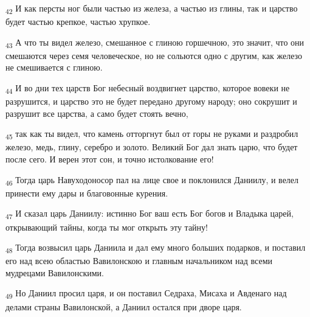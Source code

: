 \begin{tcolorbox}
\textsubscript{42} И как персты ног были частью из железа, а частью из глины, так и царство будет частью крепкое, частью хрупкое.
\end{tcolorbox}
\begin{tcolorbox}
\textsubscript{43} А что ты видел железо, смешанное с глиною горшечною, это значит, что они смешаются через семя человеческое, но не сольются одно с другим, как железо не смешивается с глиною.
\end{tcolorbox}
\begin{tcolorbox}
\textsubscript{44} И во дни тех царств Бог небесный воздвигнет царство, которое вовеки не разрушится, и царство это не будет передано другому народу; оно сокрушит и разрушит все царства, а само будет стоять вечно,
\end{tcolorbox}
\begin{tcolorbox}
\textsubscript{45} так как ты видел, что камень отторгнут был от горы не руками и раздробил железо, медь, глину, серебро и золото. Великий Бог дал знать царю, что будет после сего. И верен этот сон, и точно истолкование его!
\end{tcolorbox}
\begin{tcolorbox}
\textsubscript{46} Тогда царь Навуходоносор пал на лице свое и поклонился Даниилу, и велел принести ему дары и благовонные курения.
\end{tcolorbox}
\begin{tcolorbox}
\textsubscript{47} И сказал царь Даниилу: истинно Бог ваш есть Бог богов и Владыка царей, открывающий тайны, когда ты мог открыть эту тайну!
\end{tcolorbox}
\begin{tcolorbox}
\textsubscript{48} Тогда возвысил царь Даниила и дал ему много больших подарков, и поставил его над всею областью Вавилонскою и главным начальником над всеми мудрецами Вавилонскими.
\end{tcolorbox}
\begin{tcolorbox}
\textsubscript{49} Но Даниил просил царя, и он поставил Седраха, Мисаха и Авденаго над делами страны Вавилонской, а Даниил остался при дворе царя.
\end{tcolorbox}
